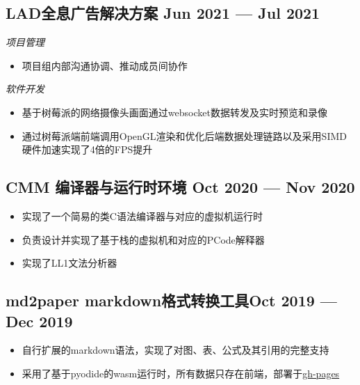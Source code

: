 \documentclass[a4,12pt]{article}
\newcommand{\subtext}[1]{
#1\par\vspace{-0.3cm}}
\newenvironment{zitemize}{
\begin{itemize}\itemsep0pt \parskip0pt \parsep1pt}
{\end{itemize}\vspace{-0.5cm}}
\begin{document}
\vspace{-0.3cm}

\subsection*{LAD全息广告解决方案 \hfill \textbf{Jun 2021 --- Jul 2021}}
\vspace{0.1cm}
\subtext{\textit{项目管理}}
\begin{zitemize}
    \item 项目组内部沟通协调、推动成员间协作
\end{zitemize}

\vspace{0.1cm}
\subtext{\textit{软件开发}}
\begin{zitemize}
    \item 基于树莓派的网络摄像头画面通过websocket数据转发及实时预览和录像
    \item 通过树莓派端前端调用OpenGL渲染和优化后端数据处理链路以及采用SIMD硬件加速实现了4倍的FPS提升
    
\end{zitemize}

\vspace{-0.3cm}
\subsection*{CMM 编译器与运行时环境 \hfill \textbf{Oct 2020 --- Nov 2020}}
\begin{zitemize}
    \item 实现了一个简易的类C语法编译器与对应的虚拟机运行时 
    \item 负责设计并实现了基于栈的虚拟机和对应的PCode解释器
    \item 实现了LL1文法分析器
\end{zitemize}

\vspace{-0.3cm}
\subsection*{md2paper markdown格式转换工具\hfill \textbf{Oct 2019 --- Dec 2019}}
\begin{zitemize}
    \item 自行扩展的markdown语法，实现了对图、表、公式及其引用的完整支持
    \item 采用了基于pyodide的wasm运行时，所有数据只存在前端，部署于\href{https://tzy15368.github.io/md2paper/md2paper.html}{gh-pages}
\end{zitemize}
\end{document}
